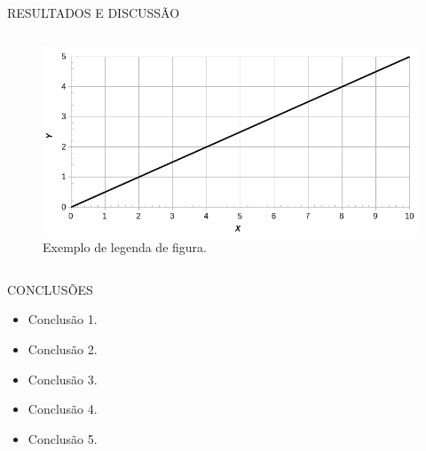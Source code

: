 \documentclass[final]{beamer}
\begin{document}
\begin{frame}[t, fragile = singleslide]{}
\begin{columns}[t]
\begin{column}{0.945\textwidth}
\begin{block}{RESULTADOS E DISCUSSÃO}
\begin{column}[T]{0.33\textwidth}
\begin{figure}[!htb]
\centering
\caption{Exemplo de legenda de figura.}
\label{fig:graficoxy3}
\includegraphics[width = 0.75\columnwidth]{./Figuras/graficoxy}
\end{figure}
\end{column}
\end{block}

\end{column}

\end{columns}

\begin{columns}[t]

\begin{column}{0.45\textwidth}

\begin{block}{CONCLUSÕES}
\begin{itemize}
\item Conclusão 1.
\item Conclusão 2.
\item Conclusão 3.
\item Conclusão 4.
\item Conclusão 5.
\end{itemize}
\end{block}


\end{column}
\end{columns}
\end{frame}
\end{document}

